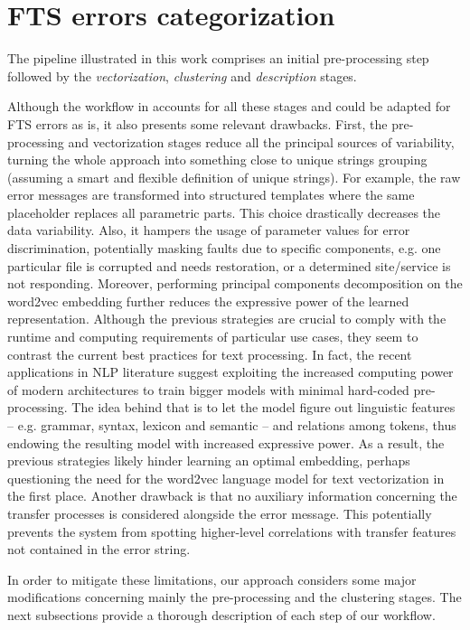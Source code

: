 \section{FTS errors categorization} \label{sec:pipeline}

The pipeline illustrated in this work comprises an initial pre-processing step followed by the \textit{vectorization}, \textit{clustering} and \textit{description} stages.

Although the workflow in
 accounts for all these stages and could be adapted for FTS errors as is, it also presents some relevant drawbacks.
First, the pre-processing and vectorization stages reduce all the principal sources of variability, turning the whole approach into something close to unique strings grouping (assuming a smart and flexible definition of unique strings). 
For example,  the raw error messages are transformed into structured templates where the same placeholder replaces all parametric parts.
This choice drastically decreases the data variability. Also, it hampers the usage of parameter values for error discrimination, potentially masking faults due to specific components, e.g. one particular file is corrupted and needs restoration, or a determined site/service is not responding.
Moreover, performing principal components decomposition on the word2vec embedding further reduces the expressive power of the learned representation.
Although the previous strategies are crucial to comply with the runtime and computing requirements of particular use cases, they seem to contrast the current best practices for text processing. 
In fact,  the recent applications in NLP literature suggest exploiting the increased computing power of modern architectures to train bigger models with minimal hard-coded pre-processing. 
The idea behind that is to let the model figure out linguistic features -- e.g. grammar, syntax, lexicon and semantic -- and relations among tokens, thus endowing the resulting model with increased expressive power.
As a result, the previous strategies likely hinder learning an optimal embedding, perhaps questioning the need for the word2vec language model for text vectorization in the first place.
Another drawback is that no auxiliary information concerning the transfer processes is considered alongside the error message. This potentially prevents the system from spotting higher-level correlations with transfer features not contained in the error string.

In order to mitigate these limitations, our approach considers some major modifications concerning mainly the pre-processing and the clustering stages.
The next subsections provide a thorough description of each step of our workflow.%




